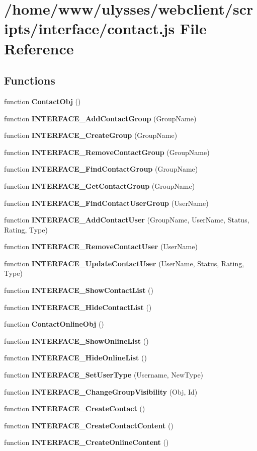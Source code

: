 \section{/home/www/ulysses/webclient/scripts/interface/contact.js File Reference}
\label{interface_2contact_8js}
\subsection*{Functions}
\begin{CompactItemize}
\item 
function {\bf ContactObj} ()
\item 
function {\bf INTERFACE\_\-AddContactGroup} (GroupName)
\item 
function {\bf INTERFACE\_\-CreateGroup} (GroupName)
\item 
function {\bf INTERFACE\_\-RemoveContactGroup} (GroupName)
\item 
function {\bf INTERFACE\_\-FindContactGroup} (GroupName)
\item 
function {\bf INTERFACE\_\-GetContactGroup} (GroupName)
\item 
function {\bf INTERFACE\_\-FindContactUserGroup} (UserName)
\item 
function {\bf INTERFACE\_\-AddContactUser} (GroupName, UserName, Status, Rating, Type)
\item 
function {\bf INTERFACE\_\-RemoveContactUser} (UserName)
\item 
function {\bf INTERFACE\_\-UpdateContactUser} (UserName, Status, Rating, Type)
\item 
function {\bf INTERFACE\_\-ShowContactList} ()
\item 
function {\bf INTERFACE\_\-HideContactList} ()
\item 
function {\bf ContactOnlineObj} ()
\item 
function {\bf INTERFACE\_\-ShowOnlineList} ()
\item 
function {\bf INTERFACE\_\-HideOnlineList} ()
\item 
function {\bf INTERFACE\_\-SetUserType} (Username, NewType)
\item 
function {\bf INTERFACE\_\-ChangeGroupVisibility} (Obj, Id)
\item 
function {\bf INTERFACE\_\-CreateContact} ()
\item 
function {\bf INTERFACE\_\-CreateContactContent} ()
\item 
function {\bf INTERFACE\_\-CreateOnlineContent} ()
\end{CompactItemize}


